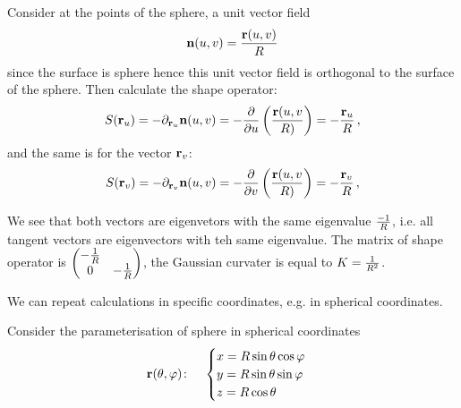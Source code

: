 \documentclass[12pt]{article}
\theoremstyle{theorem}
\numberwithin{equation}{section}
\begin{document}
{   Consider at the points of the sphere, a unit vector field
                \begin{equation*}
           {\bf n}(u,v)={{\bf r}(u,v)\over R}
                 \end{equation*} 
since the surface is sphere hence this unit vector field
is orthogonal to the surface of the sphere.
       Then calculate the shape operator:
                       \begin{equation*}
           S({\bf r}_u)=
           -\partial_{{\bf r}_u}{\bf n}(u,v)=
           -{\partial \over \partial u}
         \left({\bf r}(u,v\over R)\right)=-{{\bf r}_u\over R}\,,
                       \end{equation*}
and the same is for the vector ${\bf r}_v$:
        \begin{equation*}
           S({\bf r}_v)=
           -\partial_{{\bf r}_v}{\bf n}(u,v)=
           -{\partial \over \partial v}\left({\bf r}(u,v\over R)\right)=-{{\bf r}_v\over R}\,,
                       \end{equation*}

We see that both vectors are eigenvetors with the same eigenvalue
   $-1\over R$, i.e. {\rm all} tangent vectors are eigenvectors
with teh same eigenvalue.  The matrix of shape operator
is $\begin{pmatrix}-{1\over R}  &\cr 0 & -{1\over R}\end{pmatrix}$,
the Gaussian curvater is equal to $K={1\over R^2}$.



   \bigskip

We can repeat calculations in specific coordinates,
e.g. in spherical coordinates.

Consider the  parameterisation
 of sphere in spherical coordinates
\begin{equation}\label{surfacesphere11}
  {\bf r}(\theta,\varphi)\colon\quad
  \begin{cases}
  x=R\sin\theta\cos\varphi\\
  y=R\sin\theta\sin\varphi\\
  z=R\cos\theta\\
  \end{cases}
\end{equation}

}
\end{document}
